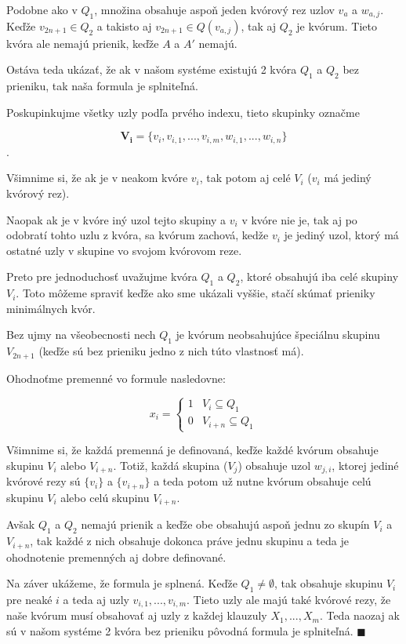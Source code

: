 Podobne ako v $Q_1$, množina obsahuje aspoň jeden kvórový rez uzlov $v_a$ a $w_{a,j}$.
\\
Keďže $v_{2n+1}\in Q_2$ a takisto aj $v_{2n+1}\in Q(v_{a,j})$, tak aj $Q_2$ je kvórum.
Tieto kvóra ale nemajú prienik, keďže $A$ a $A'$ nemajú.

Ostáva teda ukázať, že ak v našom systéme existujú 2 kvóra $Q_1$ a $Q_2$ bez prieniku,
tak naša formula je splniteľná.

Poskupinkujme všetky uzly podľa prvého indexu, tieto skupinky označme

$$\mathbf{V_i}=\{v_i, v_{i,1}, ..., v_{i,m}, w_{i,1}, ..., w_{i,n}\}$$.

Všimnime si, že ak je v neakom kvóre $v_i$, tak potom aj celé $V_i$
($v_i$ má jediný kvórový rez).

Naopak ak je v kvóre iný uzol tejto skupiny a $v_i$ v kvóre nie je,
tak aj po odobratí tohto uzlu z kvóra, sa kvórum zachová, kedže $v_i$ je jediný uzol,
ktorý má ostatné uzly v skupine vo svojom kvórovom reze.

Preto pre jednoduchosť uvažujme kvóra $Q_1$ a $Q_2$, ktoré obsahujú iba celé skupiny $V_i$.
Toto môžeme spraviť keďže ako sme ukázali vyššie, stačí skúmať prieniky minimálnych kvór.

Bez ujmy na všeobecnosti nech $Q_1$ je kvórum neobsahujúce špeciálnu skupinu
$V_{2n+1}$ (keďže sú bez prieniku jedno z nich túto vlastnosť má).

Ohodnoťme premenné vo formule nasledovne:

$$x_i= \begin{cases}
            1 & V_i \subseteq Q_1 \\
            0 & V_{i+n} \subseteq Q_1
       \end{cases}$$

\vspace{5mm}
Všimnime si, že každá premenná je definovaná, keďže každé kvórum obsahuje skupinu
$V_i$ alebo $V_{i+n}$.
Totiž, každá skupina ($V_j$) obsahuje uzol $w_{j,i}$, ktorej jediné
kvórové rezy sú $\{v_i\}$ a $\{v_{i+n}\}$ a teda potom už nutne kvórum obsahuje
celú skupinu $V_i$ alebo celú skupinu $V_{i+n}$.

Avšak $Q_1$ a $Q_2$ nemajú prienik a keďže obe obsahujú aspoň jednu zo skupín $V_i$
a $V_{i+n}$, tak každé z nich obsahuje dokonca práve jednu skupinu a teda je ohodnotenie
premenných aj dobre definované.

Na záver ukážeme, že formula je splnená.
Keďže $Q_1 \neq \emptyset$, tak obsahuje skupinu $V_i$ pre neaké $i$
a teda aj uzly $v_{i,1}, ..., v_{i,m}$.
Tieto uzly ale majú také kvórové rezy, že naše kvórum musí obsahovať aj uzly
z každej klauzuly $X_1, ..., X_m$.
Teda naozaj ak sú v našom systéme 2 kvóra bez prieniku pôvodná formula je
splniteľná. $\blacksquare$

